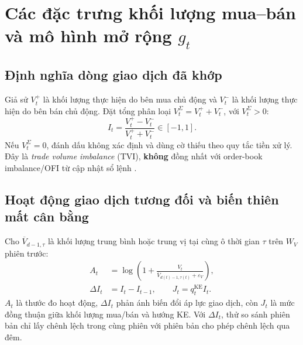\documentclass[12pt,a4paper,oneside]{article}
\begin{document}
\section{Các đặc trưng khối lượng mua--bán và mô hình mở rộng $g_t$}
\subsection{Định nghĩa dòng giao dịch đã khớp}
Giả sử $V_t^+$ là khối lượng thực hiện do bên mua chủ động và $V_t^-$ là khối lượng thực hiện do bên bán chủ động. Đặt tổng phân loại $V_t^\Sigma=V_t^++V_t^-$, với $V_t^\Sigma>0$:
\begin{equation}\label{eq:imb}
I_t=\frac{V_t^+-V_t^-}{V_t^++V_t^-}\in[-1,1].
\end{equation}
Nếu $V_t^\Sigma=0$, đánh dấu không xác định và dùng cờ thiếu theo quy tắc tiền xử lý. Đây là \emph{trade volume imbalance} (TVI), \textbf{không} đồng nhất với order-book imbalance/OFI từ cập nhật sổ lệnh \cite{cont2014}.

\subsection{Hoạt động giao dịch tương đối và biến thiên mất cân bằng}
Cho $\overline V_{d-1,\tau}$ là khối lượng trung bình hoặc trung vị tại cùng ô thời gian $\tau$ trên $W_V$ phiên trước:
\begin{align}
A_t&=\log\left(1+\frac{V_t}{\overline V_{d(t)-1,\tau(t)}+\varepsilon_V}\right),\\
\Delta I_t&=I_t-I_{t-1},\qquad
J_t=q_t^{\mathrm{KE}} I_t.
\end{align}
$A_t$ là thước đo hoạt động, $\Delta I_t$ phản ánh biến đổi áp lực giao dịch, còn $J_t$ là mức đồng thuận giữa khối lượng mua/bán và hướng KE. Với $\Delta I_t$, thử so sánh phiên bản chỉ lấy chênh lệch trong cùng phiên với phiên bản cho phép chênh lệch qua đêm.
\end{document}

